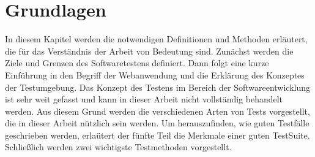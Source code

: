 \chapter{Grundlagen}\label{ch:grundlagen}

In diesem Kapitel werden die notwendigen Definitionen und Methoden erläutert,
die für das Verständnis der Arbeit von Bedeutung sind. Zunächst werden die
Ziele und Grenzen des Softwaretestens definiert. Dann folgt eine kurze
Einführung in den Begriff der Webanwendung und  die Erklärung des
Konzeptes der Testumgebung. Das Konzept des Testens im Bereich der
Softwareentwicklung ist sehr weit gefasst und kann in dieser Arbeit
nicht vollständig behandelt werden. Aus diesem Grund werden die
verschiedenen Arten von Tests vorgestellt, die in dieser Arbeit
nützlich sein werden.  Um herauszufinden, wie guten Testfälle
geschrieben werden, erlaütert der fünfte Teil die Merkmale einer
guten \Gls{TestSuite}.  Schließlich werden zwei wichtigste
Testmethoden vorgestellt.




